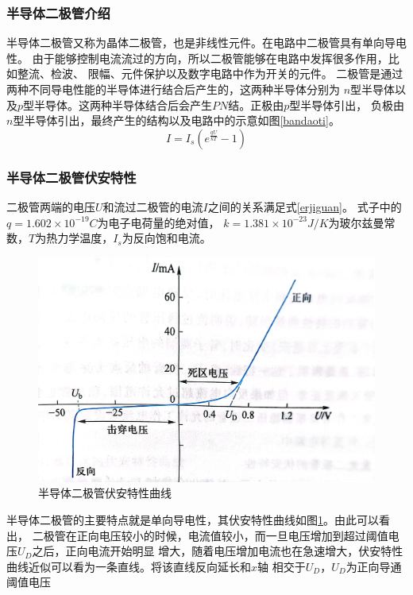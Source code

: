 \documentclass{ctexart}
\begin{document}
    \subsubsection{半导体二极管介绍}
    半导体二极管又称为晶体二极管，也是非线性元件。在电路中二极管具有单向导电性。
    由于能够控制电流流过的方向，所以二极管能够在电路中发挥很多作用，比如整流、检波、
    限幅、元件保护以及数字电路中作为开关的元件。
    二极管是通过两种不同导电性能的半导体进行结合后产生的，这两种半导体分别为
    $n$型半导体以及$p$型半导体。这两种半导体结合后会产生$PN$结。正极由$p$型半导体引出，
    负极由$n$型半导体引出，最终产生的结构以及电路中的示意如图\ref{bandaoti}。
    \begin{equation}\label{erjiguan}
      I=I_{s}(e^{ \frac{qU}{kT}}-1)
    \end{equation}

    \subsubsection{半导体二极管伏安特性}
    二极管两端的电压$U$和流过二极管的电流$I$之间的关系满足式\ref{erjiguan}。
    式子中的$q=1.602\times 10^{-19}C$为电子电荷量的绝对值，
    $k=1.381\times 10^{-23}J/K$为玻尔兹曼常数，$T$为热力学温度，$I_{s}$为反向饱和电流。
    \begin{figure}[tbh]
      \centering
      \includegraphics[width=1\textwidth]{erjiguanfuantexing.jpg}
      \caption{半导体二极管伏安特性曲线}\label{erjiguanfuantexing}
    \end{figure}
    
    半导体二极管的主要特点就是单向导电性，其伏安特性曲线如图\ref{erjiguanfuantexing}。由此可以看出，
    二极管在正向电压较小的时候，电流值较小，而一旦电压增加到超过阈值电压$U_{D}$之后，正向电流开始明显
    增大，随着电压增加电流也在急速增大，伏安特性曲线近似可以看为一条直线。将该直线反向延长和$x$轴
    相交于$U_{D}$，$U_{D}$为正向导通阈值电压
\end{document}
